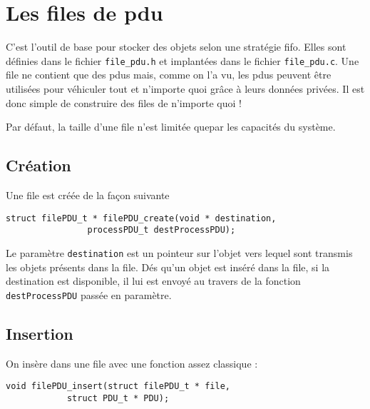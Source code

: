 %
\section{Les files de {\sc pdu}}
\label{section:file}

   C'est l'outil de base pour stocker des objets selon une stratégie
{\sc fifo}. Elles sont définies dans le fichier {\tt file\_pdu.h} et
implantées dans le fichier {\tt file\_pdu.c}. Une file ne contient que
des {\sc pdu}s mais, comme on l'a vu, les {\sc pdu}s peuvent être
utilisées pour véhiculer tout et n'importe quoi grâce à leurs données
privées. Il est donc simple de construire des files de n'importe quoi
!

   Par défaut, la taille d'une file n'est limitée quepar les capacités
du système.

%
\subsection{Création}

   Une file est créée de la façon suivante 

\begin{verbatim}
struct filePDU_t * filePDU_create(void * destination,
			    processPDU_t destProcessPDU);
\end{verbatim}

   Le paramètre \lstinline!destination! est un pointeur sur l'objet
vers lequel sont transmis les objets présents dans la file. Dés qu'un
objet est inséré dans la file, si la destination est disponible, il
lui est envoyé au travers de la fonction \lstinline!destProcessPDU!
passée en paramètre.

%
\subsection{Insertion}

   On insère dans une file avec une fonction assez classique :

\begin{verbatim}
void filePDU_insert(struct filePDU_t * file,
		    struct PDU_t * PDU);
\end{verbatim}


